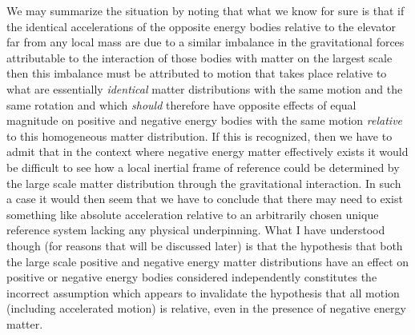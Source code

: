 \documentclass[notitlepage,12pt]{report}
\begin{document}
We may summarize the situation by noting that what we know for sure is that if the identical accelerations of the opposite energy bodies relative to the elevator far from any local mass are due to a similar imbalance in the gravitational forces attributable to the interaction of those bodies with matter on the largest scale then this imbalance must be attributed to motion that takes place relative to what are essentially \textit{identical} matter distributions with the same motion and the same rotation and which \textit{should} therefore have opposite effects of equal magnitude on positive and negative energy bodies with the same motion \textit{relative} to this homogeneous matter distribution. If this is recognized, then we have to admit that in the context where negative energy matter effectively exists it would be difficult to see how a local inertial frame of reference could be determined by the large scale matter distribution through the gravitational interaction. In such a case it would then seem that we have to conclude that there may need to exist something like absolute acceleration relative to an arbitrarily chosen unique reference system lacking any physical underpinning. What I have understood though (for reasons that will be discussed later) is that the hypothesis that both the large scale positive and negative energy matter distributions have an effect on positive or negative energy bodies considered independently constitutes the incorrect assumption which appears to invalidate the hypothesis that all motion (including accelerated motion) is relative, even in the presence of negative energy matter.
\end{document}

